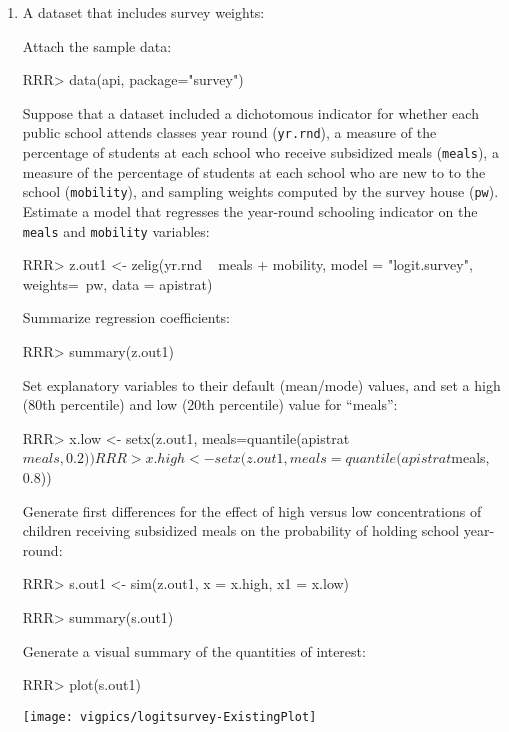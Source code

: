 \begin{enumerate} 

\item A dataset that includes survey weights:

Attach the sample data: 
\begin{Schunk}
\begin{Sinput}
RRR> data(api, package="survey") 
\end{Sinput}
\end{Schunk}

Suppose that a dataset included a dichotomous indicator 
for whether each public school attends classes year round ({\tt yr.rnd}), a measure of 
the percentage of students at each school who receive subsidized 
meals ({\tt meals}), a measure of the percentage of students at 
each school who are new to to the school ({\tt mobility}), and sampling 
weights computed by the survey house ({\tt pw}).  Estimate a model
that regresses the year-round schooling indicator on the {\tt meals} and {\tt mobility}
variables:
\begin{Schunk}
\begin{Sinput}
RRR> z.out1 <- zelig(yr.rnd ~ meals + mobility, model = "logit.survey", weights=~pw, data = apistrat)
\end{Sinput}
\end{Schunk}
Summarize regression coefficients:
\begin{Schunk}
\begin{Sinput}
RRR>  summary(z.out1)
\end{Sinput}
\end{Schunk}
Set explanatory variables to their default (mean/mode) values, and
set a high (80th percentile) and low (20th percentile) value for
``meals'': 
\begin{Schunk}
\begin{Sinput}
RRR> x.low <- setx(z.out1, meals=quantile(apistrat$meals, 0.2)) 
RRR> x.high <- setx(z.out1, meals=quantile(apistrat$meals, 0.8)) 
\end{Sinput}
\end{Schunk}
Generate first differences for the
effect of high versus low concentrations of children receiving
subsidized meals on the probability of holding school year-round: 
\begin{Schunk}
\begin{Sinput}
RRR>  s.out1 <- sim(z.out1, x = x.high, x1 = x.low)
\end{Sinput}
\end{Schunk}
\begin{Schunk}
\begin{Sinput}
RRR>  summary(s.out1)
\end{Sinput}
\end{Schunk}
Generate a visual summary of the quantities of interest:
\begin{center}
\begin{Schunk}
\begin{Sinput}
RRR>  plot(s.out1)
\end{Sinput}
\end{Schunk}
\texttt{[image: vigpics/logitsurvey-ExistingPlot]}
\end{center}


\end{enumerate}

